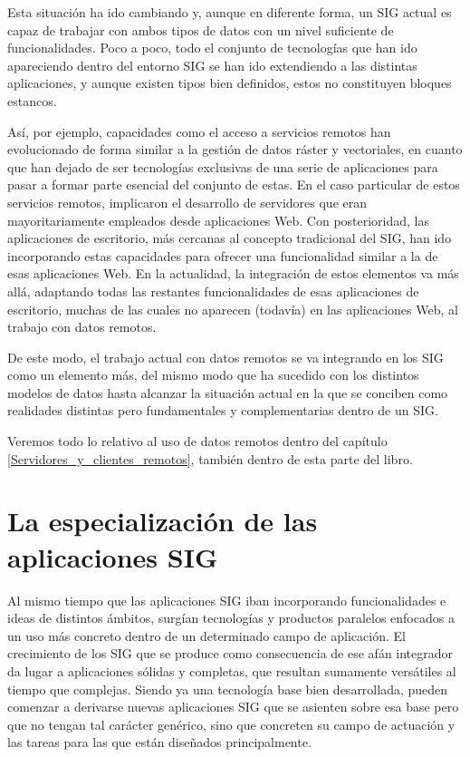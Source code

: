 Esta situación ha ido cambiando y, aunque en diferente forma, un SIG actual es capaz de trabajar con ambos tipos de datos con un nivel suficiente de funcionalidades. Poco a poco, todo el conjunto de tecnologías que han ido apareciendo dentro del entorno SIG se han ido extendiendo a las distintas aplicaciones, y aunque existen tipos bien definidos, estos no constituyen bloques estancos.

Así, por ejemplo, capacidades como el acceso a servicios remotos han evolucionado de forma similar a la gestión de datos ráster y vectoriales, en cuanto que han dejado de ser tecnologías exclusivas de una serie de aplicaciones para pasar a formar parte esencial del conjunto de estas. En el caso particular de estos servicios remotos, implicaron el desarrollo de servidores que eran mayoritariamente empleados desde aplicaciones Web. Con posterioridad, las aplicaciones de escritorio, más cercanas al concepto tradicional del SIG, han ido incorporando estas capacidades para ofrecer una funcionalidad similar a la de esas aplicaciones Web. En la actualidad, la integración de estos elementos va más allá, adaptando todas las restantes funcionalidades de esas aplicaciones de escritorio, muchas de las cuales no aparecen (todavía) en las aplicaciones Web, al trabajo con datos remotos.

De este modo, el trabajo actual con datos remotos se va integrando en los SIG como un elemento más, del mismo modo que ha sucedido con los distintos modelos de datos hasta alcanzar la situación actual en la que se conciben como realidades distintas pero fundamentales y complementarias dentro de un SIG.

Veremos todo lo relativo al uso de datos remotos dentro del capítulo \ref{Servidores_y_clientes_remotos}, también dentro de esta parte del libro.


\section{La especialización de las aplicaciones SIG}

Al mismo tiempo que las aplicaciones SIG iban incorporando funcionalidades e ideas de distintos ámbitos, surgían tecnologías y productos paralelos enfocados a un uso más concreto dentro de un determinado campo de aplicación. El crecimiento de los SIG que se produce como consecuencia de ese afán integrador da lugar a aplicaciones sólidas y completas, que resultan sumamente versátiles al tiempo que complejas. Siendo ya una tecnología base bien desarrollada, pueden comenzar a derivarse nuevas aplicaciones SIG que se asienten sobre esa base pero que no tengan tal carácter genérico, sino que concreten su campo de actuación y las tareas para las que están diseñados principalmente.

